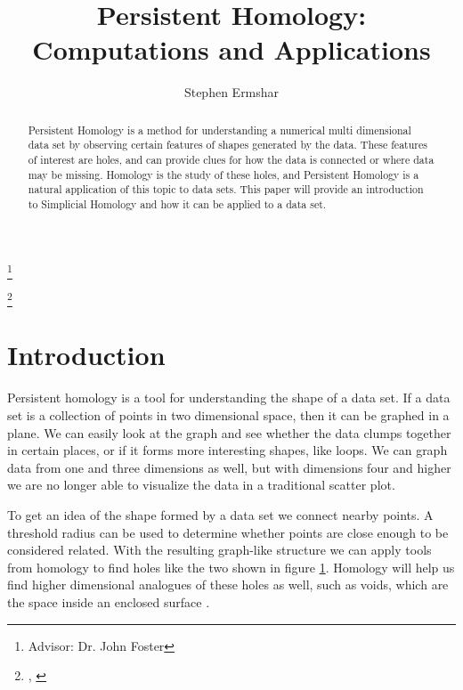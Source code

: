 

\title[Persistent Homology]{Persistent Homology: Computations and Applications}
\author{Stephen Ermshar}
\address{Department of Mathematics, Walla Walla University, College Place, WA 99324}
\date{} %
\thanks{Advisor: Dr. John Foster}

\thanks{\tiny{\DTMtoday, \DTMcurrenttime}}
\rfoot{\hfill\newline\tiny{\DTMtoday, \DTMcurrenttime}}




\begin{abstract}
    Persistent Homology is a method for understanding a numerical multi dimensional data set by observing certain features of shapes generated by the data.
    These features of interest are holes, and can provide clues for how the data is connected or where data may be missing.
    Homology is the study of these holes, and Persistent Homology is a natural application of this topic to data sets.
    This paper will provide an introduction to Simplicial Homology and how it can be applied to a data set.
\end{abstract}
\maketitle

\section{Introduction}

Persistent homology is a tool for understanding the shape of a data set.
If a data set is a collection of points in two dimensional space, then it can be graphed in a plane.
We can easily look at the graph and see whether the data clumps together in certain places, or if it forms more interesting shapes, like loops.
We can graph data from one and three dimensions as well, but with dimensions four and higher we are no longer able to visualize the data in a traditional scatter plot.

\begin{figure}[h]
    \centering
    \scalebox{0.75}{}
    \caption{}
    \label{fig:persistence-demo-r25}
\end{figure}

To get an idea of the shape formed by a data set we connect nearby points.
A threshold radius can be used to determine whether points are close enough to be considered related.
With the resulting graph-like structure we can apply tools from homology to find holes like the two shown in figure \ref{fig:persistence-demo-r25}.
Homology will help us find higher dimensional analogues of these holes as well, such as voids, which are the space inside an enclosed surface .

